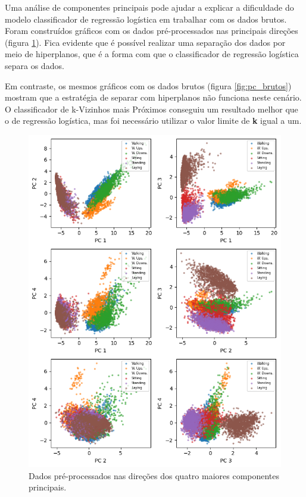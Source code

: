 \documentclass[final,5p]{elsarticle}
\numberwithin{equation}{section}
\begin{document}
        Uma análise de componentes principais pode ajudar a explicar a dificuldade do modelo classificador de regressão logística em trabalhar com os dados brutos. Foram construídos gráficos com os dados pré-processados nas principais direções (figura \ref{fig:pc_preprocessados}). Fica evidente que é possível realizar uma separação dos dados por meio de hiperplanos, que é a forma com que o classificador de regressão logística separa os dados.

        Em contraste, os mesmos gráficos com os dados brutos (figura \ref{fig:pc_brutos}) mostram que a estratégia de separar com hiperplanos não funciona neste cenário. O classificador de k-Vizinhos mais Próximos conseguiu um resultado melhor que o de regressão logística, mas foi necessário utilizar o valor limite de \textbf{k} igual a um.

        \begin{figure}[hbt!]
            \includegraphics[width=0.95\columnwidth]{C_PrincipalComponents.png}
            \caption{Dados pré-processados nas direções dos quatro maiores componentes principais.}
            \label{fig:pc_preprocessados}
        \end{figure}
\end{document}
